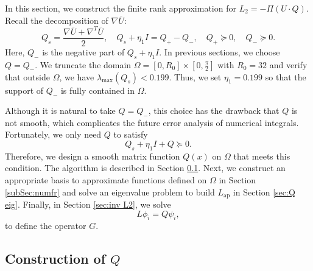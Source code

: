 \documentclass[11pt,a4paper]{article}
\numberwithin{equation}{section}
\newcommand{\tmop}[1]{\ensuremath{\operatorname{#1}}}
\begin{document}
In this section, we construct the finite rank approximation for $L_2 = - \Pi
(U \cdot Q)$. Recall the decomposition of $\nabla \overline{U}$:
\[ Q_s = \frac{\nabla \overline{U} + \nabla^T \overline{U}}{2}, \quad Q_s +
   \eta_1 I = Q_{+} - Q_{-}, \quad Q_{+} \succeq 0, \quad Q_{-} \succeq 0. \]
Here, $Q_{-}$ is the negative part of $Q_s + \eta_1 I$. In previous sections, we
choose $Q = Q_{-}$. We truncate the domain $\Omega = [0, R_0] \times \left[ 0,
\frac{\pi}{2} \right]$ with $R_0 = 32$ and verify that outside $\Omega$, we
have $\lambda_{\max} (Q_s) < 0.199$. Thus, we set $\eta_1 = 0.199$ so that the
support of $Q_{-}$ is fully contained in $\Omega$.

Although it is natural to take $Q = Q_{-}$, this choice has the drawback that
$Q$ is not smooth, which complicates the future error analysis of numerical
integrals. Fortunately, we only need $Q$ to satisfy
\begin{equation}
  Q_s + \eta_1 I + Q \succeq 0. \label{eq:Q cond}
\end{equation}
Therefore, we design a smooth matrix function $Q (x)$ on $\Omega$ that meets
this condition. The algorithm is described in Section \ref{sec:def Q}. Next,
we construct an appropriate basis to approximate functions defined on $\Omega$
in Section \ref{subSec:numfr} and solve an eigenvalue problem to build
$L_{\tmop{ap}}$ in Section \ref{sec:Q eig}. Finally, in Section \ref{sec:inv
L2}, we solve
\[ L \phi_i = Q \psi_i, \]
to define the operator $G$.

\subsection{Construction of $Q$}\label{sec:def Q}
\end{document}
